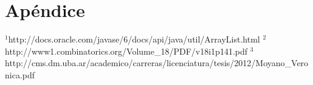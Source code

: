 \section{Apéndice}

$ ^{1}$http://docs.oracle.com/javase/6/docs/api/java/util/ArrayList.html
$ ^{2}$http://www1.combinatorics.org/Volume\_18/PDF/v18i1p141.pdf
$ ^{3}$http://cms.dm.uba.ar/academico/carreras/licenciatura/tesis/2012/Moyano\_Veronica.pdf

